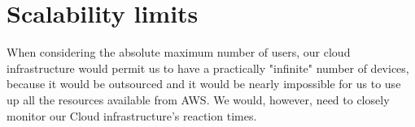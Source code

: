 \section{Scalability limits}
When considering the absolute maximum number of users, our cloud infrastructure
would permit us to have a practically "infinite" number of devices, because it would
be outsourced and it would be nearly impossible for us to use up all the resources
available from AWS. We would, however, need to closely monitor our Cloud infrastructure's
reaction times.

